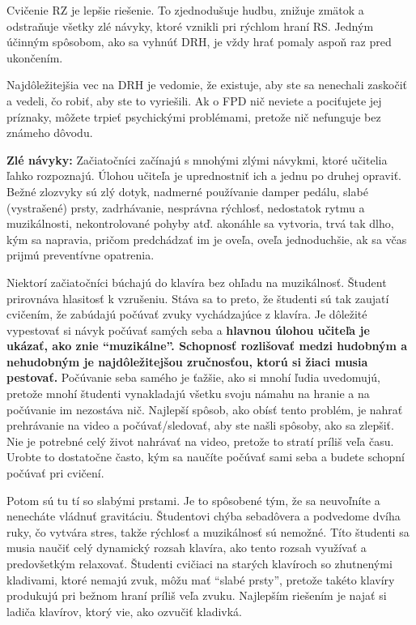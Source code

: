 \documentclass[11pt,a4paper]{book}
\begin{document}
Cvičenie RZ je lepšie riešenie. To zjednodušuje hudbu, znižuje zmätok a odstraňuje všetky zlé návyky, ktoré vznikli pri rýchlom hraní RS. Jedným účinným spôsobom, ako sa vyhnúť DRH, je vždy hrať pomaly aspoň raz pred ukončením.

Najdôležitejšia vec na DRH je vedomie, že existuje, aby ste sa nenechali zaskočiť a vedeli, čo robiť, aby ste to vyriešili. Ak o FPD nič neviete a pociťujete jej príznaky, môžete trpieť psychickými problémami, pretože nič nefunguje bez známeho dôvodu.

\textbf{Zlé návyky:} Začiatočníci začínajú s mnohými zlými návykmi, ktoré učitelia ľahko rozpoznajú. Úlohou učiteľa je uprednostniť ich a jednu po druhej opraviť. Bežné zlozvyky sú zlý dotyk, nadmerné používanie damper pedálu, slabé (vystrašené) prsty, zadrhávanie, nesprávna rýchlosť, nedostatok rytmu a muzikálnosti, nekontrolované pohyby atď. akonáhle sa vytvoria, trvá tak dlho, kým sa napravia, pričom predchádzať im je oveľa, oveľa jednoduchšie, ak sa včas prijmú preventívne opatrenia.

Niektorí začiatočníci búchajú do klavíra bez ohľadu na muzikálnosť. Študent prirovnáva hlasitosť k vzrušeniu. Stáva sa to preto, že študenti sú tak zaujatí cvičením, že zabúdajú počúvať zvuky vychádzajúce z klavíra. Je dôležité vypestovať si návyk počúvať samých seba a \textbf{hlavnou úlohou učiteľa je ukázať, ako znie “muzikálne”. Schopnosť rozlišovať medzi hudobným a nehudobným je najdôležitejšou zručnosťou, ktorú si žiaci musia pestovať.} Počúvanie seba samého je ťažšie, ako si mnohí ľudia uvedomujú, pretože mnohí študenti vynakladajú všetku svoju námahu na hranie a na počúvanie im nezostáva nič. Najlepší spôsob, ako obísť tento problém, je nahrať prehrávanie na video a počúvať/sledovať, aby ste našli spôsoby, ako sa zlepšiť. Nie je potrebné celý život nahrávať na video, pretože to stratí príliš veľa času. Urobte to dostatočne často, kým sa naučíte počúvať sami seba a budete schopní počúvať pri cvičení.

Potom sú tu tí so slabými prstami. Je to spôsobené tým, že sa neuvoľníte a nenecháte vládnuť gravitáciu. Študentovi chýba sebadôvera a podvedome dvíha ruky, čo vytvára stres, takže rýchlosť a muzikálnosť sú nemožné. Títo študenti sa musia naučiť celý dynamický rozsah klavíra, ako tento rozsah využívať a predovšetkým relaxovať. Študenti cvičiaci na starých klavíroch so zhutnenými kladivami, ktoré nemajú zvuk, môžu mať “slabé prsty”, pretože takéto klavíry produkujú pri bežnom hraní príliš veľa zvuku. Najlepším riešením je najať si ladiča klavírov, ktorý vie, ako ozvučiť kladivká.
\end{document}
